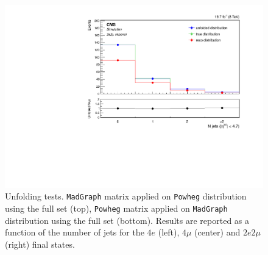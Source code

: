 \begin{figure}[hbtp]
\begin{center}
    \includegraphics[width=0.8\cmsFigWidth]{Figures/Unfolding/MCTests/Jets_ZZTo2e2m_PowMatrix_MadDistr_FullSample_fr}  
 \caption{Unfolding tests. \texttt{MadGraph} matrix applied on \texttt{Powheg} distribution using the full set (top), \texttt{Powheg} matrix applied on \texttt{MadGraph} distribution using the full set (bottom). Results are reported as a function of the number of jets for the $4e$ (left), $4\mu$ (center) and $2e2\mu$ (right) final states.}
    \label{fig:MCtest_Jets2}
  \end{center}
\end{figure}
\clearpage
